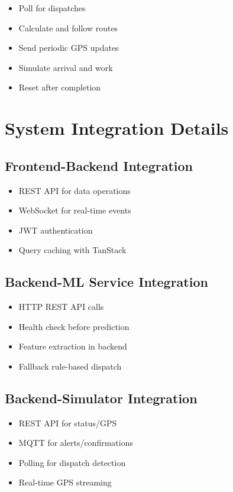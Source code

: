 \begin{itemize}
    \item Poll for dispatches
    \item Calculate and follow routes
    \item Send periodic GPS updates
    \item Simulate arrival and work
    \item Reset after completion
\end{itemize}

\section{System Integration Details}

\subsection{Frontend-Backend Integration}

\begin{itemize}
    \item REST API for data operations
    \item WebSocket for real-time events
    \item JWT authentication
    \item Query caching with TanStack
\end{itemize}

\subsection{Backend-ML Service Integration}

\begin{itemize}
    \item HTTP REST API calls
    \item Health check before prediction
    \item Feature extraction in backend
    \item Fallback rule-based dispatch
\end{itemize}

\subsection{Backend-Simulator Integration}

\begin{itemize}
    \item REST API for status/GPS
    \item MQTT for alerts/confirmations
    \item Polling for dispatch detection
    \item Real-time GPS streaming
\end{itemize}

